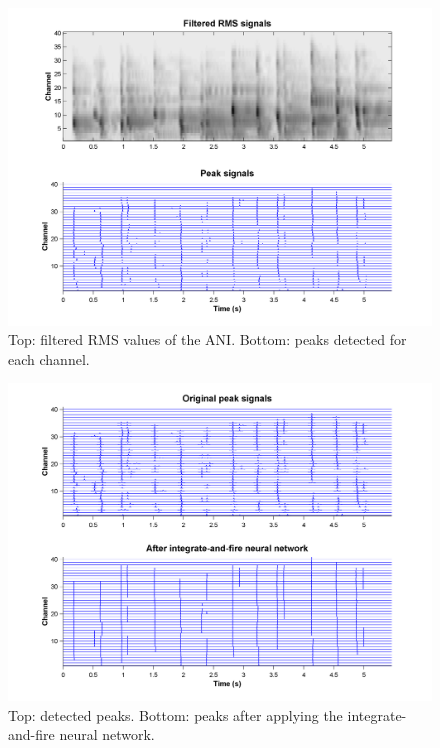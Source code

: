 \begin{figure}[h]
    \centering
    \includegraphics[width=\IPEMDefaultFigureWidth]{Graphics/OnsetsOnsetPeakDetection}
    \caption{Top: filtered RMS values of the ANI. Bottom: peaks detected for each channel.}
    \label{Fig:OnsetsOnsetPeakDetection}
\end{figure}

\begin{figure}[h]
    \centering
    \includegraphics[width=\IPEMDefaultFigureWidth]{Graphics/OnsetsOnsetPattern}
    \caption{Top: detected peaks. Bottom: peaks after applying the integrate-and-fire neural network.}
    \label{Fig:OnsetsOnsetPattern}
\end{figure}

